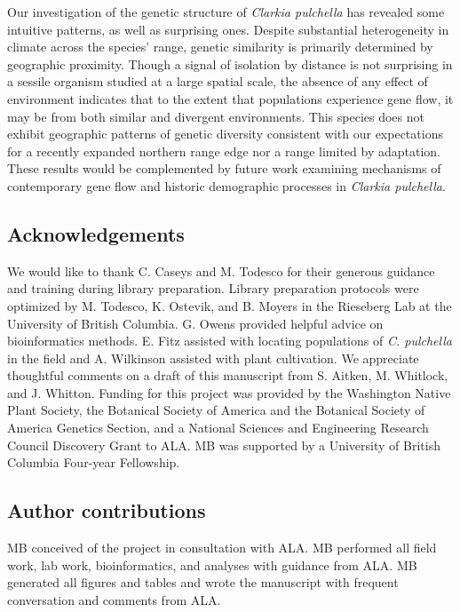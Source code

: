 \documentclass{article}
\begin{document}
Our investigation of the genetic structure of \textit{Clarkia pulchella} has revealed some intuitive patterns, as well as surprising ones. Despite substantial heterogeneity in climate across the species' range, genetic similarity is primarily determined by geographic proximity. Though a signal of isolation by distance is not surprising in a sessile organism studied at a large spatial scale, the absence of any effect of environment indicates that to the extent that populations experience gene flow, it may be from both similar and divergent environments. This species does not exhibit geographic patterns of genetic diversity consistent with our expectations for a recently expanded northern range edge nor a range limited by adaptation. These results would be complemented by future work examining mechanisms of contemporary gene flow and historic demographic processes in \textit{Clarkia pulchella}.


\subsection*{Acknowledgements}

We would like to thank C. Caseys and M. Todesco for their generous guidance and training during library preparation. Library preparation protocols were optimized by M. Todesco, K. Ostevik, and B. Moyers in the Rieseberg Lab at the University of British Columbia. G. Owens provided helpful advice on bioinformatics methods. E. Fitz assisted with locating populations of \textit{C. pulchella} in the field and A. Wilkinson assisted with plant cultivation. We appreciate thoughtful comments on a draft of this manuscript from S. Aitken, M. Whitlock, and J. Whitton. Funding for this project was provided by the Washington Native Plant Society, the Botanical Society of America and the Botanical Society of America Genetics Section, and a National Sciences and Engineering Research Council Discovery Grant to ALA. MB was supported by a University of British Columbia Four-year Fellowship. 

\subsection*{Author contributions}

MB conceived of the project in consultation with ALA. MB performed all field work, lab work, bioinformatics, and analyses with guidance from ALA. MB generated all figures and tables and wrote the manuscript with frequent conversation and comments from ALA. 
\end{document}
